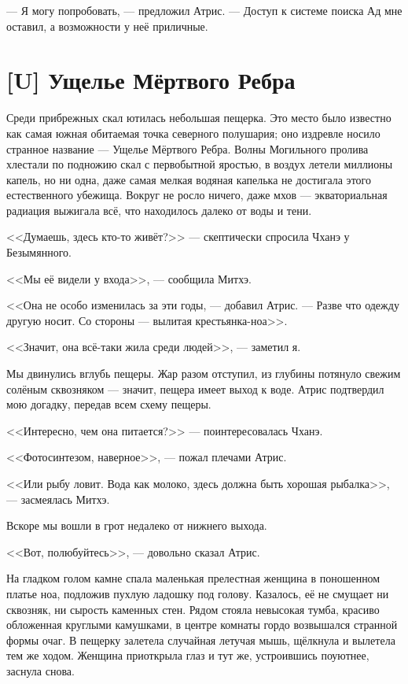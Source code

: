 --- Я могу попробовать, --- предложил Атрис.
--- Доступ к системе поиска Ад мне оставил, а возможности у неё приличные.

\section{[U] Ущелье Мёртвого Ребра}

Среди прибрежных скал ютилась небольшая пещерка.
Это место было известно как самая южная обитаемая точка северного полушария;
оно издревле носило странное название --- Ущелье Мёртвого Ребра.
Волны Могильного пролива хлестали по подножию скал с первобытной яростью, в воздух летели миллионы капель, но ни одна, даже самая мелкая водяная капелька не достигала этого естественного убежища.
Вокруг не росло ничего, даже мхов --- экваториальная радиация выжигала всё, что находилось далеко от воды и тени.

<<Думаешь, здесь кто-то живёт?>> --- скептически спросила Чханэ у Безымянного.

<<Мы её видели у входа>>, --- сообщила Митхэ.

<<Она не особо изменилась за эти годы, --- добавил Атрис.
--- Разве что одежду другую носит.
Со стороны --- вылитая крестьянка-ноа>>.

<<Значит, она всё-таки жила среди людей>>, --- заметил я.

Мы двинулись вглубь пещеры.
Жар разом отступил, из глубины потянуло свежим солёным сквозняком --- значит, пещера имеет выход к воде.
Атрис подтвердил мою догадку, передав всем схему пещеры.

<<Интересно, чем она питается?>> --- поинтересовалась Чханэ.

<<Фотосинтезом, наверное>>, --- пожал плечами Атрис.

<<Или рыбу ловит.
Вода как молоко, здесь должна быть хорошая рыбалка>>, --- засмеялась Митхэ.

Вскоре мы вошли в грот недалеко от нижнего выхода.

<<Вот, полюбуйтесь>>, --- довольно сказал Атрис.

На гладком голом камне спала маленькая прелестная женщина в поношенном платье ноа, подложив пухлую ладошку под голову.
Казалось, её не смущает ни сквозняк, ни сырость каменных стен.
Рядом стояла невысокая тумба, красиво обложенная круглыми камушками, в центре комнаты гордо возвышался странной формы очаг.
В пещерку залетела случайная летучая мышь, щёлкнула и вылетела тем же ходом.
Женщина приоткрыла глаз и тут же, устроившись поуютнее, заснула снова.

